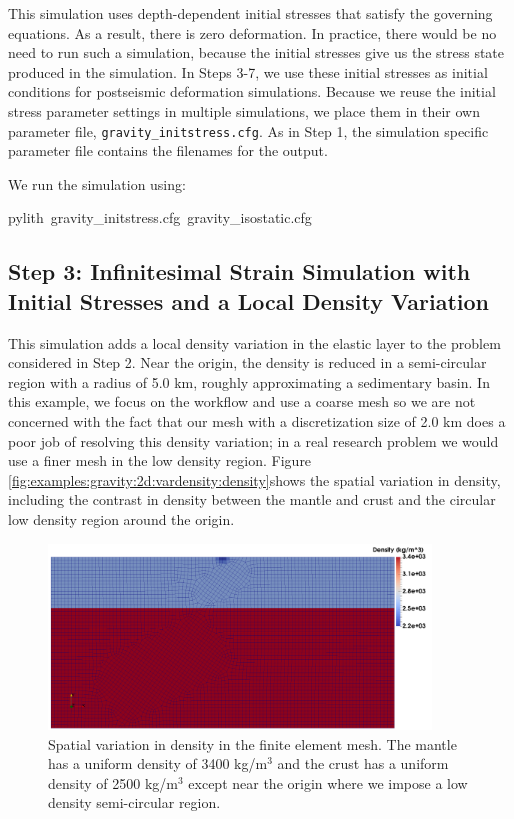 This simulation uses depth-dependent initial stresses that satisfy
the governing equations. As a result, there is zero deformation. In
practice, there would be no need to run such a simulation, because
the initial stresses give us the stress state produced in the simulation.
In Steps 3-7, we use these initial stresses as initial conditions
for postseismic deformation simulations. Because we reuse the initial
stress parameter settings in multiple simulations, we place them in
their own parameter file, \texttt{gravity\_initstress.cfg}. As in
Step 1, the simulation specific parameter file contains the filenames
for the output.

We run the simulation using:
\begin{lyxcode}
pylith~gravity\_initstress.cfg~gravity\_isostatic.cfg
\end{lyxcode}

\subsection{Step 3: Infinitesimal Strain Simulation with Initial Stresses and
a Local Density Variation}

This simulation adds a local density variation in the elastic layer
to the problem considered in Step 2. Near the origin, the density
is reduced in a semi-circular region with a radius of 5.0 km, roughly
approximating a sedimentary basin. In this example, we focus on the
workflow and use a coarse mesh so we are not concerned with the fact
that our mesh with a discretization size of 2.0 km does a poor job
of resolving this density variation; in a real research problem we
would use a finer mesh in the low density region. Figure \vref{fig:examples:gravity:2d:vardensity:density}shows
the spatial variation in density, including the contrast in density
between the mantle and crust and the circular low density region around
the origin.
\begin{figure}
\begin{centering}
\includegraphics[width=4in]{tutorials/grav2d/figs/gravity_vardensity-density}
\par\end{centering}

\caption{Spatial variation in density in the finite element mesh. The mantle
has a uniform density of 3400 kg/m$^{3}$ and the crust has a uniform
density of 2500 kg/m$^{3}$ except near the origin where we impose
a low density semi-circular region.\label{fig:examples:gravity:2d:vardensity:density}}
\end{figure}


